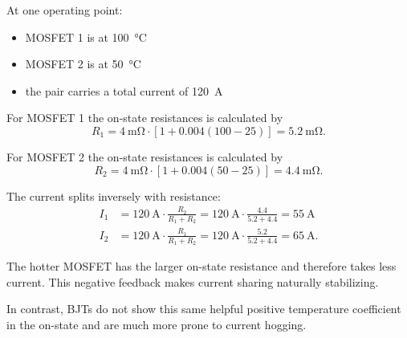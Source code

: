 At one operating point:
\begin{itemize}
    \setlength{\itemsep}{-2pt} %
    \setlength{\parskip}{-2pt} %
    \item MOSFET 1 is at \SI{100}{\celsius}
    \item MOSFET 2 is at \SI{50}{\celsius}
    \item the pair carries a total current of \SI{120}{\ampere}
\end{itemize}


\begin{solutionblock}
    For MOSFET 1 the on-state resistances is calculated by
    \begin{equation}
        R_1 = \SI{4}{\milli\ohm} \cdot \left[ 1 + 0.004(100 - 25) \right]
        = \SI{5.2}{\milli\ohm}.
    \end{equation}

    For MOSFET 2 the on-state resistances is calculated by
    \begin{equation}
        R_2 = \SI{4}{\milli\ohm} \cdot \left[ 1 + 0.004(50 - 25) \right]
        = \SI{4.4}{\milli\ohm}.
    \end{equation}
\end{solutionblock}


\begin{solutionblock}
    The current splits inversely with resistance:
    \begin{align}
        I_1 &= \SI{120}{\ampere} \cdot \frac{R_2}{R_1 + R_2}
        = \SI{120}{\ampere} \cdot \frac{4.4}{5.2 + 4.4}
        = \SI{55}{\ampere} \\
        I_2 &= \SI{120}{\ampere} \cdot \frac{R_1}{R_1 + R_2}
        = \SI{120}{\ampere} \cdot \frac{5.2}{5.2 + 4.4}
        = \SI{65}{\ampere}.
    \end{align}
\end{solutionblock}


\begin{solutionblock}
    The hotter MOSFET has the larger on-state resistance and therefore takes less current. 
    This negative feedback makes current sharing naturally stabilizing.

    In contrast, BJTs do not show this same helpful positive temperature coefficient in the on-state and are much more prone to current hogging.
\end{solutionblock}

